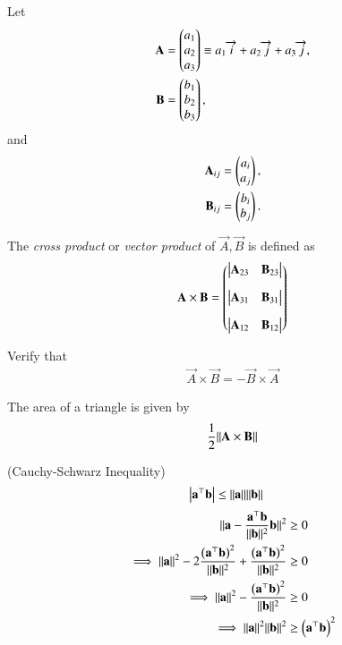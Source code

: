\item Let 
\begin{align}
  \mathbf{A} &= \begin{pmatrix}a_1\\a_2 \\ a_3\end{pmatrix} \equiv a_1\overrightarrow{i}+a_2\overrightarrow{j}+a_3\overrightarrow{j}, 
  \\
  \mathbf{B} &= \begin{pmatrix}b_1\\b_2 \\ b_3\end{pmatrix}, 
\end{align}
and 
\begin{align}
  \mathbf{A}_{ij} &= \begin{pmatrix}a_i\\a_j\end{pmatrix}, 
  \\
  \mathbf{B}_{ij} &= \begin{pmatrix}b_i\\b_j\end{pmatrix}. 
\end{align}

\item The {\em cross product} or {\em vector product} of $\vec{A}, \vec{B}$ is defined as
\begin{align}
  \label{eq:cross3d}
	\mathbf{A} \times \mathbf{B} = \begin{pmatrix} \begin{vmatrix}\mathbf{A}_{23} & \mathbf{B}_{23}\end{vmatrix} \\[10pt] \begin{vmatrix}\mathbf{A}_{31} & \mathbf{B}_{31}\end{vmatrix} \\[10pt] \begin{vmatrix}\mathbf{A}_{12}  & \mathbf{B}_{12}\end{vmatrix}\end{pmatrix}
\end{align}
\item Verify that
\begin{align}
  \vec{A} \times \vec{B} = -  \vec{B} \times \vec{A} 
\end{align}
\item The area of a triangle is given by 
\begin{align}
	\frac{1}{2} \lVert  \mathbf{A} \times \mathbf{B}\rVert
\end{align}
\item (Cauchy-Schwarz Inequality)
    \begin{align}
        \label{eq:dot-mag-ineq}
	    \left\vert\mathbf{a}^\top\mathbf{b}\right\vert &\le \lVert\mathbf{a}\rVert\lVert\mathbf{b}\rVert
    \end{align}
    \solution
	\begin{align}
        \lVert\mathbf{a}-\frac{\mathbf{a}^\top\mathbf{b}}{\lVert\mathbf{b}\rVert^2}\mathbf{b}\rVert^2 &\ge 0 \\
        \implies \lVert\mathbf{a}\rVert^2 - 2\frac{\left(\mathbf{a}^\top\mathbf{b}\right)^2}{\lVert\mathbf{b}\rVert^2} + \frac{\left(\mathbf{a}^\top\mathbf{b}\right)^2}{\lVert\mathbf{b}\rVert^2} &\ge 0 \\
        \implies \lVert\mathbf{a}\rVert^2 - \frac{\left(\mathbf{a}^\top\mathbf{b}\right)^2}{\lVert\mathbf{b}\rVert^2} &\ge 0 \\
        \implies \lVert\mathbf{a}\rVert^2\lVert\mathbf{b}\rVert^2 &\ge \left(\mathbf{a}^\top\mathbf{b}\right)^2 \\
    \end{align}
